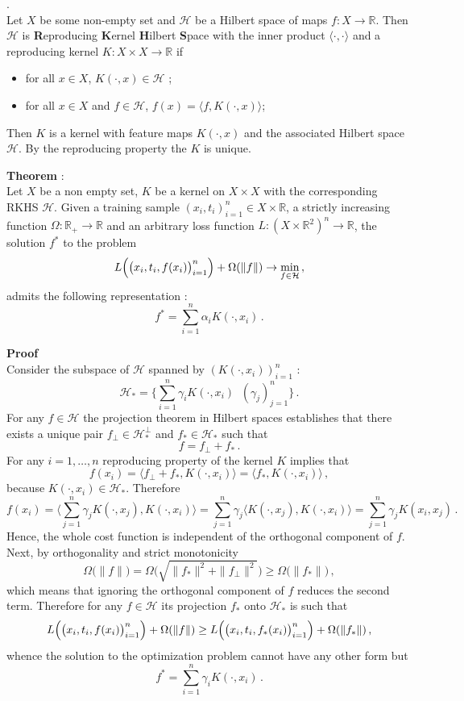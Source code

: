 \documentclass[a4paper]{article}
\newcommand{\Real}{\mathbb{R}}
\newcommand{\Hcal}{\mathcal{H}}
\begin{document}
 .\hfill\\
Let $X$ be some non-empty set and $\Hcal$ be a Hilbert space of maps $f:X\to\Real$.
Then $\Hcal$ is \textbf{R}eproducing \textbf{K}ernel \textbf{H}ilbert \textbf{S}pace
with the inner product $\langle\cdot, \cdot\rangle$ and a reproducing kernel $K: X\times X\to \Real$
if \begin{itemize}
	\item for all $x\in X$, $K(\cdot,x) \in \Hcal$ ;
	\item for all $x\in X$ and $f\in \Hcal$, $f(x) = \langle f, K(\cdot, x) \rangle$;
\end{itemize}
Then $K$ is a kernel with feature maps $K(\cdot,x)$ and the associated Hilbert space
$\Hcal$. By the reproducing property the $K$ is unique.

\noindent\textbf{Theorem} : \hfill\\
Let $X$ be a non empty set, $K$ be a kernel on $X\times X$ with the corresponding
RKHS $\Hcal$. Given a training sample $(x_i, t_i)_{i=1}^n \in X \times \Real$, a
strictly increasing function $\Omega:\Real_+\to\Real$ and an arbitrary loss function
$L:( X\times \Real^2)^n \to \Real$, the solution $f^*$ to the problem
\[
L\Bigl( \bigl(x_i,t_i,f(x_i)\bigr)_{i=1}^n \Bigr) + \Omega(\|f\|) \to \min_{f\in \Hcal}\,,
\]
admits the following representation :
\[ f^* = \sum_{i=1}^n \alpha_i K( \cdot, x_i ) \,. \]

\noindent\textbf{Proof} \hfill \\
Consider the subspace of $\Hcal$ spanned by $(K(\cdot, x_i ))_{i=1}^n$ :
\[
\Hcal_* = \bigl\{ \sum_{i=1}^n \gamma_i K(\cdot, x_i ) \,\:\,(\gamma_j)_{j=1}^n \bigr\}\,.
\]
For any $f\in \Hcal$ the projection theorem in Hilbert spaces establishes that there
exists a unique pair $f_\perp \in\Hcal_*^\perp$ and $f_* \in \Hcal_*$ such that
\[ f = f_\perp + f_* \,. \]
For any $i=1,\ldots,n$ reproducing property of the kernel $K$ implies that
\[
f(x_i)
= \langle f_\perp + f_*, K(\cdot, x_i)\rangle
= \langle f_*, K(\cdot, x_i)\rangle\,,
\]
because $K(\cdot, x_i)\in \Hcal_*$. Therefore
\[
f(x_i)
= \bigl\langle \sum_{j=1}^n \gamma_j K(\cdot, x_j ), K(\cdot, x_i)\bigr\rangle 
= \sum_{j=1}^n \gamma_j \langle K(\cdot, x_j ), K(\cdot, x_i)\rangle 
= \sum_{j=1}^n \gamma_j K(x_i, x_j)\,.
\]
Hence, the whole cost function is independent of the orthogonal component of $f$.
Next, by orthogonality and strict monotonicity
\[
\Omega\bigl( \|f\| \bigr)
= \Omega\bigl( \sqrt{\|f_*\|^2 + \|f_\perp\|^2} \bigr)
\geq \Omega\bigl( \|f_*\| \bigr)\,,
\]
which means that ignoring the orthogonal component of $f$ reduces the second term.
Therefore for any $f\in \Hcal$ its projection $f_*$ onto $\Hcal_*$ is such that
\[
L\Bigl( \bigl(x_i,t_i,f(x_i)\bigr)_{i=1}^n \Bigr) + \Omega(\|f\|)
\geq L\Bigl( \bigl(x_i,t_i,f_*(x_i)\bigr)_{i=1}^n \Bigr) + \Omega(\|f_*\|)\,,
\]
whence the solution to the optimization problem cannot have any other form but
\[ f^* = \sum_{i=1}^n \gamma_i K(\cdot, x_i)\,. \]
\end{document}
